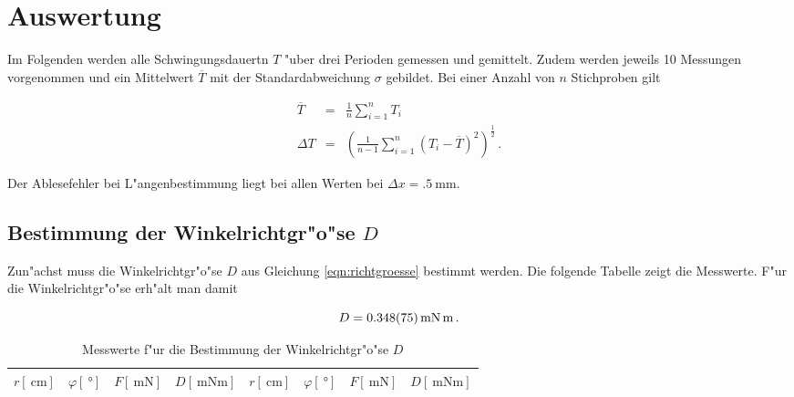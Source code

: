 \section{Auswertung}
\label{sec:auswertung}
	Im Folgenden werden alle Schwingungsdauertn $T$ "uber drei Perioden gemessen und gemittelt.
	Zudem werden jeweils 10 Messungen vorgenommen und ein Mittelwert $\overline{T}$ mit der Standardabweichung $\sigma$ gebildet.
	Bei einer Anzahl von $n$ Stichproben gilt

	\begin{eqnarray}
		\overline{T} & = & \frac{1}{n} \sum_{i = 1}^n{T_i} \nonumber \\
		\Delta T & = & \left(\frac{1}{n-1}\sum_{i = 1}^n {(T_i - \overline{T})^2}\right)^{\frac{1}{2}} \,. \nonumber
	\end{eqnarray}

	Der Ablesefehler bei L"angenbestimmung liegt bei allen Werten bei $\Delta x = \SI{.5}{\milli \meter}$.

	\subsection{Bestimmung der Winkelrichtgr"o"se $D$}
	\label{subsec:winkelrichtgroesse}
		Zun"achst muss die Winkelrichtgr"o"se $D$ aus Gleichung \eqref{eqn:richtgroesse} bestimmt werden.
		Die folgende Tabelle zeigt die Messwerte. F"ur die Winkelrichtgr"o"se erh"alt man damit

		\begin{equation*}
			D = \SI{.348 (75)}{\milli \newton \meter} \,.
		\end{equation*}

		\begin{table}[h!]
			\begin{center}
				\label{tabelle:winkelrichtgroesse}
				\caption{Messwerte f"ur die Bestimmung der Winkelrichtgr"o"se $D$}
				\begin{tabular}{|c|c|c|c||c|c|c|c|}
					\hline
					$r [\SI{}{\centi \meter}]$ & $\varphi [\SI{}{\degree}]$ &  $F [\SI{}{\milli \newton}]$ & $D [\SI{}{\milli \newton \meter}]$ & $r [\SI{}{\centi \meter}]$ & $\varphi [\SI{}{\degree}]$ &  $F [\SI{}{\milli \newton}]$ & $D [\SI{}{\milli \newton \meter}]$\\
					\hline 
					\hline
					
					\hline 
				\end{tabular}
			\end{center}
		\end{table}

